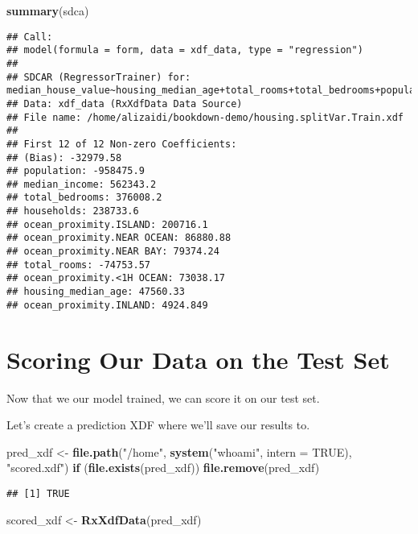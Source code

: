 \documentclass[]{book}
\newenvironment{Shaded}{\begin{snugshade}}{\end{snugshade}}
\newcommand{\KeywordTok}[1]{\textcolor[rgb]{0.13,0.29,0.53}{\textbf{#1}}}
\newcommand{\DataTypeTok}[1]{\textcolor[rgb]{0.13,0.29,0.53}{#1}}
\newcommand{\StringTok}[1]{\textcolor[rgb]{0.31,0.60,0.02}{#1}}
\newcommand{\OtherTok}[1]{\textcolor[rgb]{0.56,0.35,0.01}{#1}}
\newcommand{\ControlFlowTok}[1]{\textcolor[rgb]{0.13,0.29,0.53}{\textbf{#1}}}
\newcommand{\NormalTok}[1]{#1}
\theoremstyle{definition}
\theoremstyle{definition}
\theoremstyle{definition}
\theoremstyle{remark}
\begin{document}
\begin{Shaded}
\begin{Highlighting}[]
\KeywordTok{summary}\NormalTok{(sdca)}
\end{Highlighting}
\end{Shaded}

\begin{verbatim}
## Call:
## model(formula = form, data = xdf_data, type = "regression")
## 
## SDCAR (RegressorTrainer) for: median_house_value~housing_median_age+total_rooms+total_bedrooms+population+households+median_income+ocean_proximity
## Data: xdf_data (RxXdfData Data Source)
## File name: /home/alizaidi/bookdown-demo/housing.splitVar.Train.xdf 
## 
## First 12 of 12 Non-zero Coefficients:
## (Bias): -32979.58
## population: -958475.9
## median_income: 562343.2
## total_bedrooms: 376008.2
## households: 238733.6
## ocean_proximity.ISLAND: 200716.1
## ocean_proximity.NEAR OCEAN: 86880.88
## ocean_proximity.NEAR BAY: 79374.24
## total_rooms: -74753.57
## ocean_proximity.<1H OCEAN: 73038.17
## housing_median_age: 47560.33
## ocean_proximity.INLAND: 4924.849
\end{verbatim}

\section{Scoring Our Data on the Test
Set}\label{scoring-our-data-on-the-test-set}

Now that we our model trained, we can score it on our test set.

Let's create a prediction XDF where we'll save our results to.

\begin{Shaded}
\begin{Highlighting}[]
\NormalTok{pred_xdf <-}\StringTok{ }\KeywordTok{file.path}\NormalTok{(}\StringTok{"/home"}\NormalTok{, }\KeywordTok{system}\NormalTok{(}\StringTok{"whoami"}\NormalTok{, }\DataTypeTok{intern =} \OtherTok{TRUE}\NormalTok{), }\StringTok{"scored.xdf"}\NormalTok{)}
\ControlFlowTok{if}\NormalTok{ (}\KeywordTok{file.exists}\NormalTok{(pred_xdf)) }\KeywordTok{file.remove}\NormalTok{(pred_xdf)}
\end{Highlighting}
\end{Shaded}

\begin{verbatim}
## [1] TRUE
\end{verbatim}

\begin{Shaded}
\begin{Highlighting}[]
\NormalTok{scored_xdf <-}\StringTok{ }\KeywordTok{RxXdfData}\NormalTok{(pred_xdf)}
\end{Highlighting}
\end{Shaded}
\end{document}
